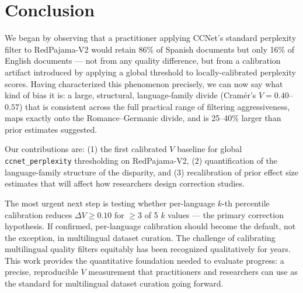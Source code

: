 \section{Conclusion}
\label{sec:conclusion}

We began by observing that a practitioner applying CCNet's standard perplexity filter to RedPajama-V2 would retain 86\% of Spanish documents but only 16\% of English documents --- not from any quality difference, but from a calibration artifact introduced by applying a global threshold to locally-calibrated perplexity scores. Having characterized this phenomenon precisely, we can now say what kind of bias it is: a large, structural, language-family divide (Cram{\'e}r's $V = 0.40$--$0.57$) that is consistent across the full practical range of filtering aggressiveness, maps exactly onto the Romance--Germanic divide, and is 25--40\% larger than prior estimates suggested.

Our contributions are: (1) the first calibrated $V$ baseline for global \texttt{ccnet\_perplexity} thresholding on RedPajama-V2, (2) quantification of the language-family structure of the disparity, and (3) recalibration of prior effect size estimates that will affect how researchers design correction studies.

The most urgent next step is testing whether per-language $k$-th percentile calibration reduces $\Delta V \geq 0.10$ for $\geq 3$ of 5 $k$ values --- the primary correction hypothesis. If confirmed, per-language calibration should become the default, not the exception, in multilingual dataset curation. The challenge of calibrating multilingual quality filters equitably has been recognized qualitatively for years. This work provides the quantitative foundation needed to evaluate progress: a precise, reproducible $V$ measurement that practitioners and researchers can use as the standard for multilingual dataset curation going forward.

